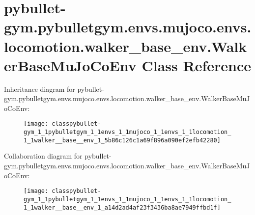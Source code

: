 \hypertarget{classpybullet-gym_1_1pybulletgym_1_1envs_1_1mujoco_1_1envs_1_1locomotion_1_1walker__base__env_1_1_walker_base_mu_jo_co_env}{}\section{pybullet-\/gym.pybulletgym.\+envs.\+mujoco.\+envs.\+locomotion.\+walker\+\_\+base\+\_\+env.\+Walker\+Base\+Mu\+Jo\+Co\+Env Class Reference}
\label{classpybullet-gym_1_1pybulletgym_1_1envs_1_1mujoco_1_1envs_1_1locomotion_1_1walker__base__env_1_1_walker_base_mu_jo_co_env}


Inheritance diagram for pybullet-\/gym.pybulletgym.\+envs.\+mujoco.\+envs.\+locomotion.\+walker\+\_\+base\+\_\+env.\+Walker\+Base\+Mu\+Jo\+Co\+Env\+:
\nopagebreak
\begin{figure}[H]
\begin{center}
\leavevmode
\texttt{[image: classpybullet-gym\_1\_1pybulletgym\_1\_1envs\_1\_1mujoco\_1\_1envs\_1\_1locomotion\_1\_1walker\_\_base\_\_env\_1\_5b86c126c1a69f896a090ef2efb42280]}
\end{center}
\end{figure}


Collaboration diagram for pybullet-\/gym.pybulletgym.\+envs.\+mujoco.\+envs.\+locomotion.\+walker\+\_\+base\+\_\+env.\+Walker\+Base\+Mu\+Jo\+Co\+Env\+:
\nopagebreak
\begin{figure}[H]
\begin{center}
\leavevmode
\texttt{[image: classpybullet-gym\_1\_1pybulletgym\_1\_1envs\_1\_1mujoco\_1\_1envs\_1\_1locomotion\_1\_1walker\_\_base\_\_env\_1\_a14d2ad4af23f3436ba8ae7949ffbd1f]}
\end{center}
\end{figure}

